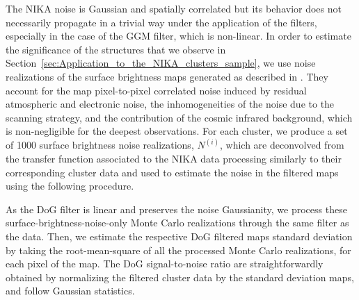 \documentclass[twocolumn,traditabstract]{aa}
\begin{document}
The NIKA noise is Gaussian and spatially correlated \citep{Adam2016a} but its behavior does not necessarily propagate in a trivial way under the application of the filters, especially in the case of the GGM filter, which is non-linear. In order to estimate the significance of the structures that we observe in Section~\ref{sec:Application_to_the_NIKA_clusters_sample}, we use noise realizations of the surface brightness maps generated as described in \cite{Adam2016a}. They account for the map pixel-to-pixel correlated noise induced by residual atmospheric and electronic noise, the inhomogeneities of the noise due to the scanning strategy, and the contribution of the cosmic infrared background, which is non-negligible for the deepest observations. For each cluster, we produce a set of 1000 surface brightness noise realizations, $N^{(i)}$, which are deconvolved from the transfer function associated to the NIKA data processing similarly to their corresponding cluster data and used to estimate the noise in the filtered maps using the following procedure. 

As the DoG filter is linear and preserves the noise Gaussianity, we process these surface-brightness-noise-only Monte Carlo realizations through the same filter as the data. Then, we estimate the respective DoG filtered maps standard deviation by taking the root-mean-square of all the processed Monte Carlo realizations, for each pixel of the map. The DoG signal-to-noise ratio are straightforwardly obtained by normalizing the filtered cluster data by the standard deviation maps, and follow Gaussian statistics.
\end{document}
